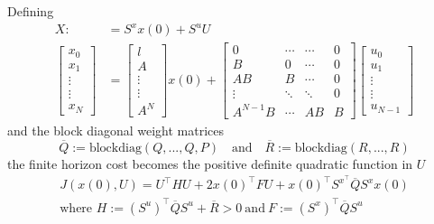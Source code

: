 \newpar{}

Defining
\noindent\begin{align*}
    X:                        & =S^x x(0)+S^u U \\
    \left.\left[
    \begin{array}
            {c}x_0 \\
            x_1    \\
            \vdots \\
            \vdots \\
            x_N
        \end{array}\right.\right] & =
    \begin{bmatrix}
        l      \\
        A      \\
        \vdots \\
        \vdots \\
        A^N
    \end{bmatrix}x(0)+
    \begin{bmatrix}
        0        & \cdots & \cdots & 0 \\
        B        & 0      & \cdots & 0 \\
        AB       & B      & \cdots & 0 \\
        \vdots   & \ddots & \ddots & 0 \\
        A^{N-1}B & \cdots & AB     & B
    \end{bmatrix}
    \begin{bmatrix}
        u_0    \\
        u_1    \\
        \vdots \\
        \vdots \\
        u_{N-1}
    \end{bmatrix}
\end{align*}
and the block diagonal weight matrices
\noindent\begin{equation*}
    \overline{Q}:=\mathrm{blockdiag}(Q,...,Q,P)\quad\mathrm{and}\quad\overline{R}:=\mathrm{blockdiag}(R,...,R)
\end{equation*}
the finite horizon cost becomes the positive definite quadratic function in $U$
\noindent\begin{gather*}
    J(x(0), U) =U^{\top}HU+2{x(0)}^{\top}FU+{x(0)}^{\top}S^{x^{\top}}\overline{Q}S^{x}x(0)\\
    \text{where } H:={(S^u)}^\top\overline{Q} S^u+\overline{R} > 0 \mathrm{~and~}F:={(S^x)}^\top\overline{Q} S^u
\end{gather*}


